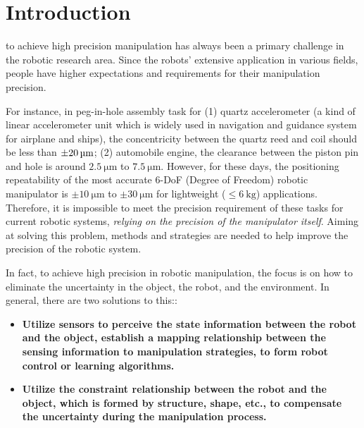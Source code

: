 \documentclass[journal,twoside,web]{ieeecolor}
\begin{document}
\section{Introduction}
\label{sec:intro}


 to achieve high precision manipulation has always been a primary challenge in the robotic research area. Since the robots’ extensive application in various fields, people have higher expectations and requirements for their manipulation precision.

For instance, in peg-in-hole assembly task for 
(1) quartz accelerometer (a kind of linear accelerometer unit which is widely used in navigation and guidance system for airplane and ships), the concentricity between the quartz reed and coil should be less than $\SI{\pm 20}{\micro\meter}$;
(2) automobile engine, the clearance between the piston pin and hole is around $\SI{2.5}{\micro\meter}$ to $\SI{7.5}{\micro\meter}$.
However, for these days, the positioning repeatability of the most accurate 6-DoF (Degree of Freedom) robotic manipulator is $\pm\SI{10}{\micro\metre}$ to $\pm\SI{30}{\micro\metre}$ for lightweight ($\le\SI{6}{\kilogram}$) applications.
Therefore, it is impossible to meet the precision requirement of these tasks for current robotic systems, \textit{relying on the precision of the manipulator itself}. 
Aiming at solving this problem, methods and strategies are needed to help improve the precision of the robotic system.

In fact, to achieve high precision in robotic manipulation, the focus is on how to eliminate the uncertainty in the object, the robot, and the environment. 
In general, there are two solutions to this::
\begin{itemize}
    \item \textbf{Utilize sensors to perceive the state information between the robot and the object, establish a mapping relationship between the sensing information to manipulation strategies, to form robot control or learning algorithms.}
        
    \item \textbf{Utilize the constraint relationship between the robot and the object, which is formed by structure, shape, etc., to compensate the uncertainty during the manipulation process.}
\end{itemize}
\end{document}
